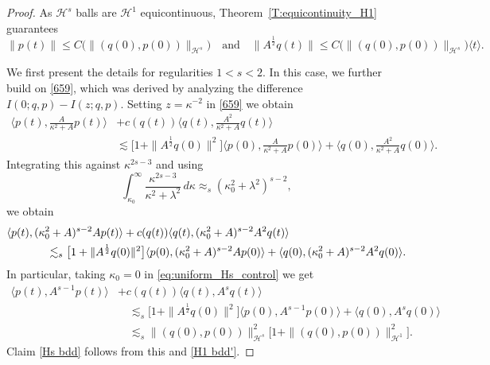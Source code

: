 \documentclass{amsart}
\newcommand{\qtq}[1]{\quad\text{#1}\quad}
\theoremstyle{definition}
\numberwithin{equation}{section}
\renewcommand{\H}{\mathcal H}
\newcommand{\la}{\langle}
\newcommand{\ra}{\rangle}
\begin{document}
\begin{proof}
As $\H^s$ balls are $\H^1$ equicontinuous, Theorem~\ref{T:equicontinuity_H1} guarantees
\begin{equation}\label{H1 bdd'}
 \|p(t)\| \leq C\bigl(\|(q(0),p(0))\|_{\H^s}\bigr) \qtq{and}
\|A^\frac12 q(t)\|\leq C\bigl(\|(q(0),p(0))\|_{\H^s}\bigr) \la t\ra.
\end{equation}

We first present the details for regularities $1<s<2$. In this case, we further build on \eqref{659}, which was derived by analyzing the difference $I(0;q,p) - I(z;q,p)$. Setting $z=\kappa^{-2}$ in \eqref{659} we obtain
\begin{align*}
\langle p(t),\tfrac{A}{\kappa^2+A}p(t)\rangle &+ c(q(t)) \langle q(t),\tfrac{A^2}{\kappa^2+A}q(t)\rangle\\
&\lesssim \bigl[1+ \|A^{\frac12}q(0)\|^2\bigr]\langle p(0),\tfrac{A}{\kappa^2+A}p(0)\rangle + \langle q(0), \tfrac{A^2}{\kappa^2+A} q(0)\rangle.
\end{align*}
Integrating this against $\kappa^{2s-3}$ and using 
\begin{equation*}
\int_{\kappa_0}^{\infty} \frac{\kappa^{2s-3}}{\kappa^2 + \lambda^2} \,d\kappa\approx_{s} (\kappa_0^2+\lambda^2)^{s-2},
\end{equation*}
we obtain
\begin{align}\label{eq:uniform_Hs_control}
\langle p(t), (\kappa_0^2&+A)^{s-2} Ap(t)\rangle + c(q(t)) \langle q(t), (\kappa_0^2+A)^{s-2}  A^2q(t)\rangle\notag\\
&\hspace{-3pt}\lesssim_s \bigl[1+ \|A^{\frac12}q(0)\|^2\bigr]\langle p(0), (\kappa_0^2+A)^{s-2} Ap(0)\rangle +  \langle q(0), (\kappa_0^2+A)^{s-2} A^2q(0)\rangle.
\end{align}
In particular, taking $\kappa_0=0$ in \eqref{eq:uniform_Hs_control} we get
\begin{align*}
\langle p(t), A^{s-1} p(t)\rangle &+ c(q(t)) \langle q(t),  A^sq(t)\rangle\\
&\quad\lesssim_s \bigl[1+ \|A^{\frac12}q(0)\|^2\bigr]\langle p(0),A^{s-1} p(0)\rangle + \langle q(0), A^sq(0)\rangle \\
&\quad \lesssim_s \|(q(0),p(0))\|_{ \H^s}^2\bigl[1+ \|(q(0),p(0))\|_{\H^1}^2\bigr]. 
\end{align*}
Claim \eqref{Hs bdd} follows from this and \eqref{H1 bdd'}.


\end{proof}
\end{document}
